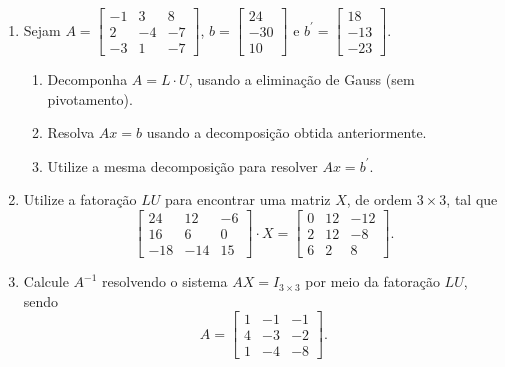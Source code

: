 \documentclass[12pt,a4paper]{article}
\newcommand{\IconCalc}{\texttt{[image: calculator.png]}}
\newlength{\SmileysLength}
\newcommand{\calc}{\hspace*{-\SmileysLength}\makebox[0pt][r]{\IconCalc}%
   \hspace*{\SmileysLength}}
\begin{document}
\begin{enumerate}
\item %
Sejam $A =
\begin{bmatrix}
-1 &  3 &  8 \\
 2 & -4 & -7 \\
-3 &  1 & -7
\end{bmatrix}$, $b =
\begin{bmatrix}
 24 \\
-30 \\
 10
\end{bmatrix}$ e $b^\prime =
\begin{bmatrix}
 18 \\
-13 \\
-23
\end{bmatrix}$.
\begin{enumerate}
\item Decomponha $A = L \cdot U$, usando a eliminação de Gauss (sem pivotamento).
\item Resolva $Ax = b$ usando a decomposição obtida anteriormente.
\item Utilize a mesma decomposição para resolver $Ax = b^\prime$.
\end{enumerate}

\item %
Utilize a fatoração $LU$ para encontrar uma matriz $X$, de ordem $3 \times 3$, tal que
\[
\begin{bmatrix}
 24 &  12 & -6\\
 16 &   6 &  0\\
-18 & -14 & 15
\end{bmatrix}
\cdot X
=
\begin{bmatrix}
0&12&-12\\
2&12&-8\\
6&2&8
\end{bmatrix}.
\]

\item %
Calcule $A^{-1}$ resolvendo o sistema $A X = I_{3 \times 3}$ por meio da fatoração $LU$, sendo
\[
A =
\begin{bmatrix}
1&-1&-1\\
4&-3&-2\\
1&-4&-8
\end{bmatrix}.
\]


\end{enumerate}
\end{document}
